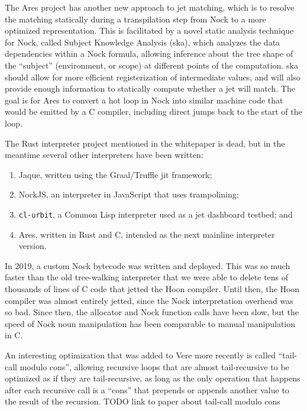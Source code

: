\documentclass[twoside]{article}
\begin{document}
The Ares project has another new approach to jet matching, which is to resolve the matching statically during a transpilation step from Nock to a more optimized representation.  This is facilitated by a novel static analysis technique for Nock, called Subject Knowledge Analysis ({\sc ska}), which analyzes the data dependencies within a Nock formula, allowing inference about the tree shape of the ``subject'' (environment, or scope) at different points of the computation.  {\sc ska} should allow for more efficient registerization of intermediate values, and will also provide enough information to statically compute whether a jet will match.  The goal is for Ares to convert a hot loop in Nock into similar machine code that would be emitted by a C compiler, including direct jumps back to the start of the loop.

The Rust interpreter project mentioned in the whitepaper is dead, but in the meantime several other interpreters have been written:

\begin{enumerate}
  \item  Jaque, written using the Graal/Truffle {\sc jit} framework;
  \item  NockJS, an interpreter in JavaScript that uses trampolining;
  \item  \texttt{cl-urbit}, a Common Lisp interpreter used as a jet dashboard testbed; and
  \item  Ares, written in Rust and C, intended as the next mainline interpreter version.
\end{enumerate}

In 2019, a custom Nock bytecode was written and deployed.  This was so much faster than the old tree-walking interpreter that we were able to delete tens of thousands of lines of C code that jetted the Hoon compiler.  Until then, the Hoon compiler was almost entirely jetted, since the Nock interpretation overhead was so bad.  Since then, the allocator and Nock function calls have been slow, but the speed of Nock noun manipulation has been comparable to manual manipulation in C.

An interesting optimization that was added to Vere more recently is called ``tail-call modulo cons'', allowing recursive loops that are almost tail-recursive to be optimized as if they are tail-recursive, as long as the only operation that happens after each recursive call is a ``cons'' that prepends or appends another value to the result of the recursion.
TODO link to paper about tail-call modulo cons
\end{document}
